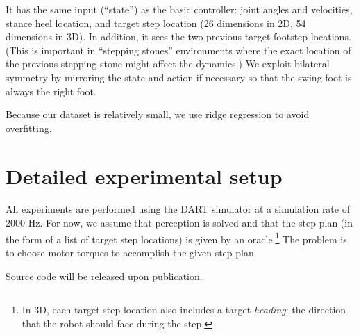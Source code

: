 \documentclass[conference]{IEEEtran}
\begin{document}
It has the same input (``state'') as the basic controller: joint angles and velocities, stance heel location, and target step location (26 dimensions in 2D, 54 dimensions in 3D).
In addition, it sees the two previous target footstep locations.
(This is important in ``stepping stones'' environments where the exact location of the previous stepping stone might affect the dynamics.)
We exploit bilateral symmetry by mirroring the state and action if necessary so that the swing foot is always the right foot.

Because our dataset is relatively small, we use ridge regression to avoid overfitting.

\section{Detailed experimental setup}

All experiments are performed using the DART simulator at a simulation rate of 2000 Hz.
For now, we assume that perception is solved and that the step plan (in the form of a list of target step locations) is given by an oracle.\footnote{
In 3D, each target step location also includes a target \emph{heading}: the direction that the robot should face during the step.}
The problem is to choose motor torques to accomplish the given step plan.

Source code will be released upon publication.
\end{document}
